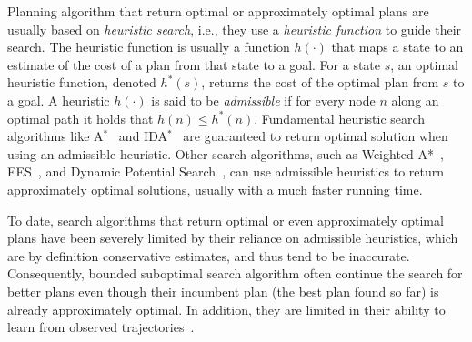 \documentclass[12pt]{article}
\begin{document}
Planning algorithm that return optimal or approximately optimal plans are usually based on {\em heuristic search}, i.e., they use a {\em heuristic function} to guide their search. The heuristic function is usually a function $h(\cdot)$ that maps a state to an estimate of the cost of a plan from that state to a goal. For a state $s$, an optimal heuristic function, denoted $h^*(s)$, returns the cost of the optimal plan from $s$ to a goal. A heuristic $h(\cdot)$  is said to be {\em admissible} if for every node $n$ along an optimal path it holds that $h(n)\leq h^*(n)$. Fundamental heuristic search algorithms like A$^*$~\cite{hart1968formal} and IDA$^*$~\cite{korf1985depth} are guaranteed to return optimal solution when using an admissible heuristic. Other search algorithms, such as Weighted A*~\cite{pohl1973avoidance}, EES~\cite{thayer2011bounded}, and Dynamic Potential Search~\cite{gilon2016dynamic}, can use admissible heuristics to return approximately optimal solutions, usually with a much faster running time. 





To date, search algorithms that return optimal or even approximately optimal plans have been severely limited by their reliance on admissible heuristics, which are by definition conservative estimates, and thus tend to be inaccurate. Consequently, bounded suboptimal search algorithm often continue the search for better plans even though their incumbent plan (the best plan found so far) is already approximately optimal. In addition, they are limited in their ability to learn from observed trajectories~\cite{thayer2011bounded,phillips2012graphs}.
\end{document}
